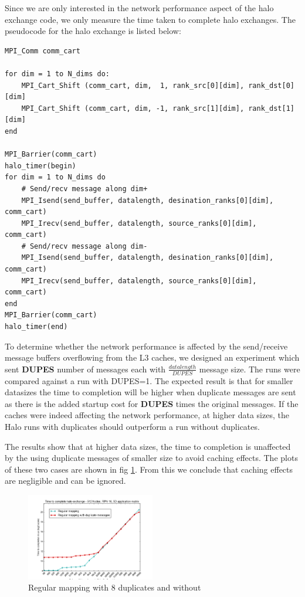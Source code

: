 \documentclass{acm_proc_article-sp}
\begin{document}
Since we are only interested in the network performance aspect of the halo exchange code, we only measure
the time taken to complete halo exchanges. The pseudocode for the halo exchange is listed below:

\begin{lstlisting}[frame=lines, basicstyle=\ttfamily,columns=fixed]
MPI_Comm comm_cart

for dim = 1 to N_dims do:
    MPI_Cart_Shift (comm_cart, dim,  1, rank_src[0][dim], rank_dst[0][dim]
    MPI_Cart_Shift (comm_cart, dim, -1, rank_src[1][dim], rank_dst[1][dim]
end

MPI_Barrier(comm_cart)
halo_timer(begin)
for dim = 1 to N_dims do
    # Send/recv message along dim+
    MPI_Isend(send_buffer, datalength, desination_ranks[0][dim], comm_cart)
    MPI_Irecv(send_buffer, datalength, source_ranks[0][dim], comm_cart)
    # Send/recv message along dim-
    MPI_Isend(send_buffer, datalength, desination_ranks[0][dim], comm_cart)
    MPI_Irecv(send_buffer, datalength, source_ranks[0][dim], comm_cart)
end
MPI_Barrier(comm_cart)
halo_timer(end)
\end{lstlisting}

To determine whether the network performance is affected by the send/receive message buffers overflowing from the
L3 caches, we designed an experiment which sent \textbf{DUPES} number of messages each with $\frac{datalength}{DUPES}$
message size. The runs were compared against a run with DUPES=1. The expected result is that for smaller datasizes
the time to completion will be higher when duplicate messages are sent as there is the added startup cost for \textbf{DUPES} times the original messages.
If the caches were indeed affecting the network performance, at higher data sizes, the Halo runs with duplicates should outperform
a run without duplicates.

The results show that at higher data sizes, the time to completion is unaffected by the using duplicate messages of smaller size to avoid caching effects.
The plots of these two cases are shown in fig \ref{fig:caching_figure_vs_without}. From this we conclude that caching effects are negligible and can be ignored.

\label{sect:caching_figure}
\begin{figure}
  \center
  \includegraphics[width=0.5\textwidth]{regular_vs_cache_duplicates.png}
  \caption{Regular mapping with 8 duplicates and without}
    \label{fig:caching_figure_vs_without}
\end{figure}
\end{document}
